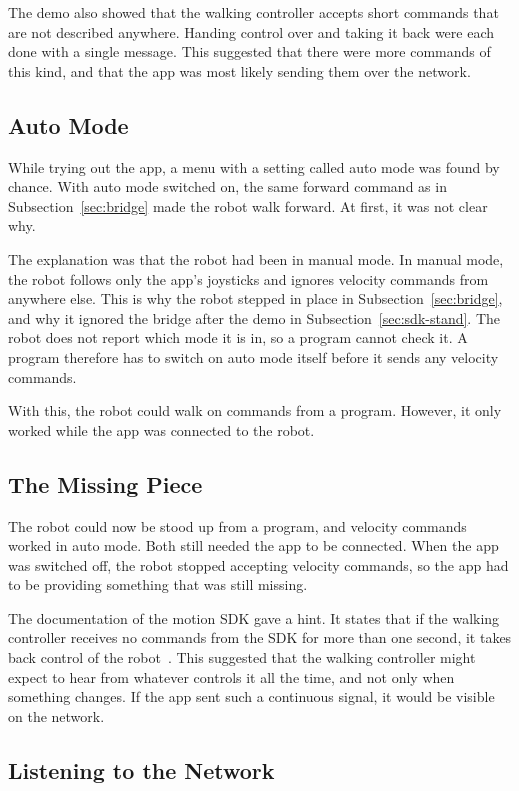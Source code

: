 The demo also showed that the walking controller accepts short commands that are not described anywhere.
Handing control over and taking it back were each done with a single message. This suggested that there
were more commands of this kind, and that the app was most likely sending them over the network.

\subsection{Auto Mode}
\label{sec:auto-mode}

While trying out the app, a menu with a setting called auto mode was found by chance. With auto mode
switched on, the same forward command as in Subsection~\ref{sec:bridge} made the robot walk forward. At
first, it was not clear why.

The explanation was that the robot had been in manual mode. In manual mode, the robot follows only the
app's joysticks and ignores velocity commands from anywhere else. This is why the robot stepped in place in
Subsection~\ref{sec:bridge}, and why it ignored the bridge after the demo in
Subsection~\ref{sec:sdk-stand}. The robot does not report which mode it is in, so a program cannot check
it. A program therefore has to switch on auto mode itself before it sends any velocity commands.

With this, the robot could walk on commands from a program. However, it only worked while the app was
connected to the robot.

\subsection{The Missing Piece}
\label{sec:missing}

The robot could now be stood up from a program, and velocity commands worked in auto mode. Both still
needed the app to be connected. When the app was switched off, the robot stopped accepting velocity
commands, so the app had to be providing something that was still missing.

The documentation of the motion SDK gave a hint. It states that if the walking controller receives no
commands from the SDK for more than one second, it takes back control of the robot~\cite{motionsdk}. This
suggested that the walking controller might expect to hear from whatever controls it all the time, and not
only when something changes. If the app sent such a continuous signal, it would be visible on the
network.

\subsection{Listening to the Network}
\label{sec:listening}

